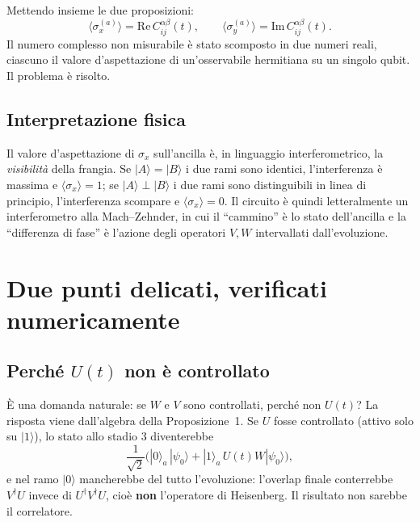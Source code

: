 \documentclass[11pt,a4paper]{article}
\begin{document}
Mettendo insieme le due proposizioni:
\begin{equation}
\boxed{\;\langle\sigma_x^{(a)}\rangle=\mathrm{Re}\,C_{ij}^{\alpha\beta}(t),
\qquad
\langle\sigma_y^{(a)}\rangle=\mathrm{Im}\,C_{ij}^{\alpha\beta}(t).\;}
\end{equation}
Il numero complesso non misurabile è stato scomposto in due numeri reali, ciascuno il valore
d'aspettazione di un'osservabile hermitiana su un singolo qubit. Il problema è risolto.

\subsection{Interpretazione fisica}

Il valore d'aspettazione di $\sigma_x$ sull'ancilla è, in linguaggio interferometrico, la
\emph{visibilità} della frangia. Se $|A\rangle=|B\rangle$ i due rami sono identici,
l'interferenza è massima e $\langle\sigma_x\rangle=1$; se $|A\rangle\perp|B\rangle$ i due rami
sono distinguibili in linea di principio, l'interferenza scompare e
$\langle\sigma_x\rangle=0$. Il circuito è quindi letteralmente un interferometro alla
Mach--Zehnder, in cui il ``cammino'' è lo stato dell'ancilla e la ``differenza di fase'' è
l'azione degli operatori $V,W$ intervallati dall'evoluzione.

\section{Due punti delicati, verificati numericamente}

\subsection{Perché $U(t)$ non è controllato}

È una domanda naturale: se $W$ e $V$ sono controllati, perché non $U(t)$? La risposta viene
dall'algebra della Proposizione~1. Se $U$ fosse controllato (attivo solo su $|1\rangle$), lo
stato allo stadio 3 diventerebbe
\begin{equation}
\frac{1}{\sqrt2}\Big(|0\rangle_a\,|\psi_0\rangle+|1\rangle_a\,U(t)W|\psi_0\rangle\Big),
\end{equation}
e nel ramo $|0\rangle$ mancherebbe del tutto l'evoluzione: l'overlap finale conterrebbe
$V^\dagger U$ invece di $U^\dagger V^\dagger U$, cioè \textbf{non} l'operatore di Heisenberg.
Il risultato non sarebbe il correlatore.
\end{document}

